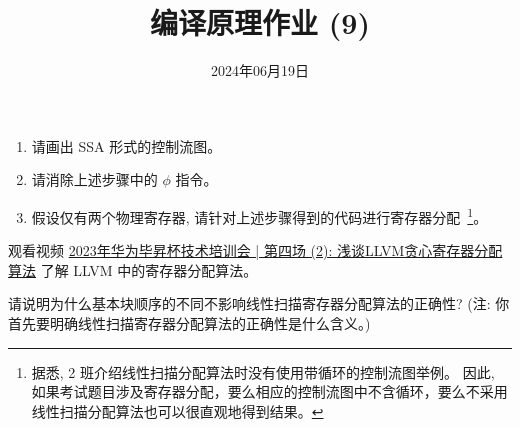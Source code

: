 \documentclass[a4paper, justified]{tufte-handout}
\title{编译原理作业 (9)}
\date{2024年06月19日}
\begin{document}
\maketitle
\noplagiarism %
\begin{abstract}
\end{abstract}
\beginrequired

\begin{problem}
	

	\begin{enumerate}[(1)]
		\item 请画出 SSA 形式的控制流图。
		\item 请消除上述步骤中的 $\phi$ 指令。
		\item 假设仅有两个物理寄存器, 请针对上述步骤得到的代码进行寄存器分配~\footnote{
			据悉, 2 班介绍线性扫描分配算法时没有使用带循环的控制流图举例。
			因此, 如果考试题目涉及寄存器分配，要么相应的控制流图中不含循环，要么不采用
			线性扫描分配算法也可以很直观地得到结果。}。
	\end{enumerate}
\end{problem}

\beginoptional

\begin{problem}
	观看视频 \href{https://shorter.me/h49cm}{2023年华为毕昇杯技术培训会 | 第四场 (2): 浅谈LLVM贪心寄存器分配算法}
	了解 LLVM 中的寄存器分配算法。
\end{problem}

\begin{problem}[线性扫描寄存器分配]
	请说明为什么基本块顺序的不同不影响线性扫描寄存器分配算法的正确性?
	(注: 你首先要明确线性扫描寄存器分配算法的正确性是什么含义。)
\end{problem}




\end{document}
